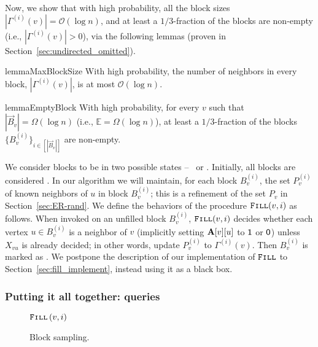 Now, we show that with high probability, all the block sizes $|\Gamma^{(i)}(v)|=\mathcal{O}(\log n)$, and at least a $1/3$-fraction of the blocks are non-empty (i.e., $|\Gamma^{(i)}(v)|>0$), via the following lemmas (proven in Section~\ref{sec:undirected_omitted}).

\begin{restatable}{lemma}{MaxBlockSize}
\label{lem:MaxBlockSize}
With high probability, the number of neighbors in every block, $|\Gamma^{(i)}(v)|$, is at most $ \mathcal{O}(\log n)$.
\end{restatable}

\begin{restatable}{lemma}{EmptyBlock}
\label{lem:EmptyBlock}
With high probability, for every $v$ such that $|\vec B_v| = \Omega(\log n)$ (i.e., $\mathbb E = \Omega(\log n)$), at least a $1/3$-fraction of the blocks $\{B^{(i)}_v\}_{i\in[|\vec B_v|]}$ are non-empty.
\end{restatable}

We consider blocks to be in two possible states -- \filled~or \unfilled. Initially, all blocks are considered \unfilled.
In our algorithm we will maintain, for each block $B^{(i)}_v$, the set $P^{(i)}_v$ of known neighbors of $u$ in block $B^{(i)}_v$;
this is a refinement of the set $P_v$ in Section~\ref{sec:ER-rand}.
We define the behaviors of the procedure $\texttt{\textsc{Fill}}(v,i)$ as follows.
When invoked on an unfilled block $B^{(i)}_v$, $\texttt{\textsc{Fill}}(v,i)$ decides whether each vertex $u \in B^{(i)}_v$ is a neighbor of $v$
(implicitly setting $\mathbf{A}[v][u]$ to $\mathsf{1}$ or $\mathsf{0}$) unless $X_{vu}$ is already decided; in other words, update $P_v^{(i)}$ to $\Gamma^{(i)}(v)$.
Then $B^{(i)}_v$ is marked as \filled.
We postpone the description of our implementation of $\texttt{\textsc{Fill}}$ to Section~\ref{sec:fill_implement}, instead using it as a black box.





\subsubsection{Putting it all together:  queries}
\label{sec:random_neighbor}
\begin{wrapfigure}[10]{R}{0.41\textwidth}
\vspace{-1.75em}
\begin{framed}
    \renewcommand\figurename{Algorithm}
    \caption{Block sampling.}
    \label{alg:random}
    \begin{algorithmic}
                    \State$\texttt{\textsc{Fill}}\left( v,i\right)$
                \EndIf
            \EndWhile
        \EndProcedure
    \end{algorithmic}
\end{framed}
\end{wrapfigure}

